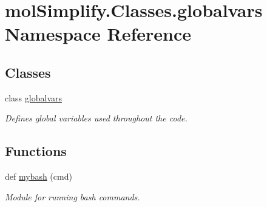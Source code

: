 \hypertarget{namespacemolSimplify_1_1Classes_1_1globalvars}{}\section{mol\+Simplify.\+Classes.\+globalvars Namespace Reference}
\label{namespacemolSimplify_1_1Classes_1_1globalvars}
\subsection*{Classes}
\begin{DoxyCompactItemize}
\item 
class \hyperlink{classmolSimplify_1_1Classes_1_1globalvars_1_1globalvars}{globalvars}
\begin{DoxyCompactList}\small\item\em Defines global variables used throughout the code. \end{DoxyCompactList}\end{DoxyCompactItemize}
\subsection*{Functions}
\begin{DoxyCompactItemize}
\item 
def \hyperlink{namespacemolSimplify_1_1Classes_1_1globalvars_a257ff4ceeae01b0f58def39acb903d95}{mybash} (cmd)
\begin{DoxyCompactList}\small\item\em Module for running bash commands. \end{DoxyCompactList}\end{DoxyCompactItemize}
